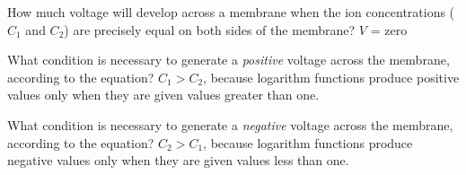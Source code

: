 





How much voltage will develop across a membrane when the ion concentrations ($C_1$ and $C_2$) are precisely equal on both sides of the membrane?  $V$ = zero

\vskip 20pt

What condition is necessary to generate a {\it positive} voltage across the membrane, according to the equation?  $C_1 > C_2$, because logarithm functions produce positive values only when they are given values greater than one.

\vskip 20pt

What condition is necessary to generate a {\it negative} voltage across the membrane, according to the equation?  $C_2 > C_1$, because logarithm functions produce negative values only when they are given values less than one.





